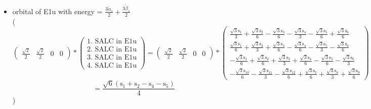 \documentclass[12pt,a4paper]{article}
\begin{document}
\begin{itemize}
\item orbital of E1u with energy = 
                                $\frac{3 \tilde{\alpha}_{s}}{2} + \frac{3 \tilde{\beta}_{s}}{2}$ \\
( 
$$
\begin{pmatrix}\frac{\sqrt{2}}{2} & \frac{\sqrt{2}}{2} & 0 & 0\end{pmatrix} * \left(\begin{array}{c}\text{1. SALC in E1u} \\ \text{2. SALC in E1u} \\ \text{3. SALC in E1u} \\ \text{4. SALC in E1u}\end{array}\right) = \begin{pmatrix}\frac{\sqrt{2}}{2} & \frac{\sqrt{2}}{2} & 0 & 0\end{pmatrix} * \begin{pmatrix}\frac{\sqrt{3} \text{s}_{1}}{3} + \frac{\sqrt{3} \text{s}_{2}}{6} - \frac{\sqrt{3} \text{s}_{3}}{6} - \frac{\sqrt{3} \text{s}_{4}}{3} - \frac{\sqrt{3} \text{s}_{5}}{6} + \frac{\sqrt{3} \text{s}_{6}}{6}\\\frac{\sqrt{3} \text{s}_{1}}{6} + \frac{\sqrt{3} \text{s}_{2}}{3} + \frac{\sqrt{3} \text{s}_{3}}{6} - \frac{\sqrt{3} \text{s}_{4}}{6} - \frac{\sqrt{3} \text{s}_{5}}{3} - \frac{\sqrt{3} \text{s}_{6}}{6}\\- \frac{\sqrt{3} \text{s}_{1}}{6} + \frac{\sqrt{3} \text{s}_{2}}{6} + \frac{\sqrt{3} \text{s}_{3}}{3} + \frac{\sqrt{3} \text{s}_{4}}{6} - \frac{\sqrt{3} \text{s}_{5}}{6} - \frac{\sqrt{3} \text{s}_{6}}{3}\\- \frac{\sqrt{3} \text{s}_{10}}{6} - \frac{\sqrt{3} \text{s}_{11}}{3} - \frac{\sqrt{3} \text{s}_{12}}{6} + \frac{\sqrt{3} \text{s}_{7}}{6} + \frac{\sqrt{3} \text{s}_{8}}{3} + \frac{\sqrt{3} \text{s}_{9}}{6}\end{pmatrix} 
 $$ $$ = \frac{\sqrt{6} \left(\text{s}_{1} + \text{s}_{2} - \text{s}_{4} - \text{s}_{5}\right)}{4} 
 $$ 
 )


\end{itemize}
\end{document}
